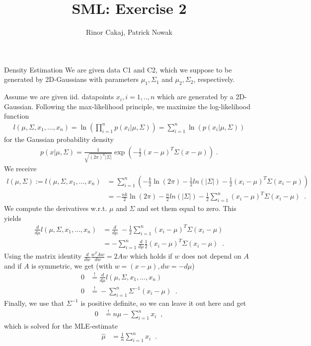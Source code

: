 \documentclass[
ngerman,
]{tudaexercise}
\newcommand{\sni}{\sum_{i=1}^{n}}
\begin{document}
	
	\title[Uebung]{SML: Exercise 2}
	\author{Rinor Cakaj, Patrick Nowak}
	
	\maketitle
	
	\begin{task}{Density Estimation}
		We are given data C1 and C2, which we suppose to be generated by 2D-Gaussians with parameters ${\mu_1,\Sigma_1}$ and ${\mu_2,\Sigma_2}$, respectively.
		\begin{subtask}
			Assume we are given iid. datapoints $x_i, i=1,..,n$ which are generated by a 2D-Gaussian. Following the max-likelihood principle, we maximize the log-likelihood function
			\begin{align*}
				l(\mu,\Sigma,x_1,...,x_n)=\ln(\prod_{i=1}^n p(x_i|\mu,\Sigma))=\sni\ln(p(x_i|\mu,\Sigma))
			\end{align*}
			for the Gaussian probability density
			\begin{align} p(x|\mu,\Sigma)=\frac{1}{\sqrt{(2\pi)^k|\Sigma|}}\exp\left( -\frac{1}{2}(x-\mu)^T\Sigma(x-\mu)\right)\;.
			\end{align}
			We receive
			\begin{align}
			l(\mu,\Sigma):=l(\mu,\Sigma,x_1,...,x_n)&=\sni\left( -\frac{k}{2}\ln(2\pi)-\frac{1}{2}ln(|\Sigma|)-\frac{1}{2}(x_i-\mu)^T\Sigma(x_i-\mu)\right) \\
			&=-\frac{nk}{2}\ln(2\pi)-\frac{n}{2}ln(|\Sigma|)-\frac{1}{2}\sni (x_i-\mu)^T\Sigma(x_i-\mu)\;\;.
			\end{align}
			We compute the derivatives w.r.t. $\mu$ and $\Sigma$ and set them equal to zero. This yields
			\begin{align*}
\frac{d}{d\mu}l(\mu,\Sigma,x_1,...,x_n)&=\frac{d}{d\mu}\; -\frac{1}{2}\sni (x_i-\mu)^T\Sigma (x_i-\mu)\\ &= -\sni \frac{d}{d\mu}\frac{1}{2}(x_i-\mu)^T\Sigma (x_i-\mu)\;\;.
			\end{align*}
			Using the matrix identity $\frac{d}{dw}\frac{w^T Aw}{dw}=2Aw$ which holds if $w$ does not depend on $A$ and if $A$ is symmetric, we get (with $w=(x-\mu), dw=-d\mu$)
			\begin{align*}
			0&\stackrel{!}{=}\frac{d}{d\mu}l(\mu,\Sigma,x_1,...,x_n)\\
			0&\stackrel{!}{=}-\sni \Sigma^{-1}(x_i-\mu)	\;\;.
			\end{align*}
			Finally, we use that $\Sigma^{-1}$ is positive definite, so we can leave it out here and get
			\begin{align*}
				0&\stackrel{!}{=}n\mu-\sni x_i\;\;,
			\end{align*}
			which is solved for the MLE-estimate
			\begin{align}
				\hat{\mu}&=\frac{1}{n}\sni x_i\;\;.
			\end{align}
		\end{subtask}
	\end{task}
	
\end{document}
